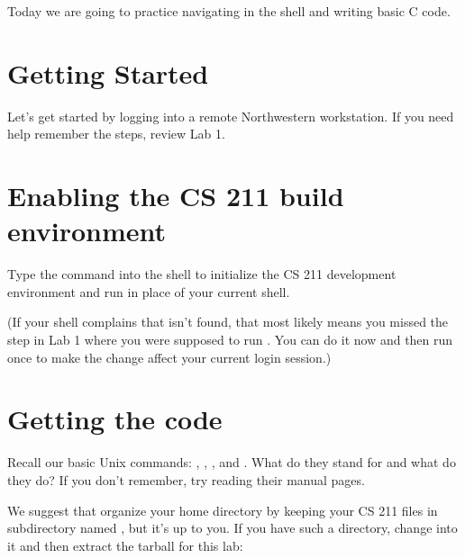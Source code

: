 \documentclass{tufte-handout}
\begin{document}
\maketitle

Today we are going to practice navigating in the shell and writing basic
C code.

\section{Getting Started}

Let's get started by logging into a remote Northwestern workstation.
If you need help remember the steps, review Lab 1.

\section{Enabling the CS 211 build environment}

Type the command 
into the shell to initialize the CS 211 development environment and
run  in place of your current shell.

(If your shell complains that  isn’t found, that most
likely means you missed the step in Lab 1 where you were supposed to run
. You can do it now and then run
 once to make the change affect your current login
session.)

\section{Getting the code}

Recall our basic Unix commands: , ,
, and . What do they stand for and what do
they do? If you don't remember, try reading their manual pages.

We suggest that organize your home directory by keeping your CS 211
files in subdirectory named , but it's up to you. If you have
such a directory, change into it and then extract the tarball for this
lab:
\end{document}
